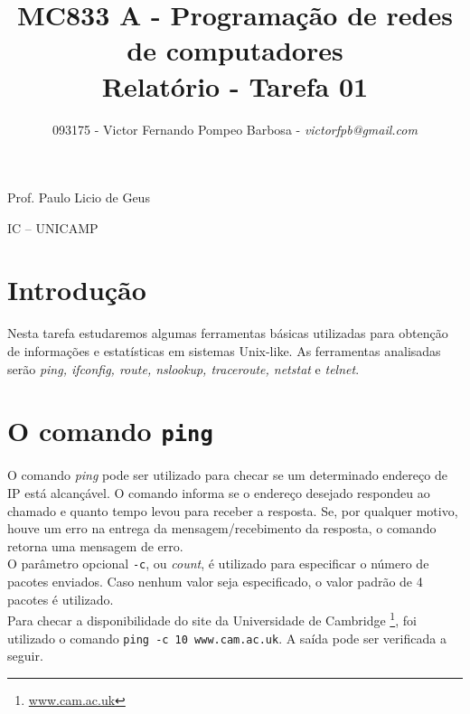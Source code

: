 \documentclass[a4paper,10pt]{article}
\begin{document}


\title{MC833 A - Programação de redes de computadores\\
Relatório - Tarefa 01}

\author {093175 - Victor Fernando Pompeo Barbosa - \textit{victorfpb@gmail.com}}


\maketitle

\centerline{Prof. Paulo Licio de Geus}
\centerline{IC -- UNICAMP}

\vspace{2cm}
\tableofcontents
    
\newpage
\section{Introdução}
\hspace{14pt}

    Nesta tarefa estudaremos algumas ferramentas básicas utilizadas para obtenção de informações e estatísticas em sistemas Unix-like. As ferramentas analisadas serão \textit{ping, ifconfig, route, nslookup, traceroute, netstat} e \textit{telnet}.

\section{O comando {\tt ping}}
O comando \textit{ping} pode ser utilizado para checar se um determinado endereço de IP está alcançável. O comando informa se o endereço desejado respondeu ao chamado e quanto tempo levou para receber a resposta. Se, por qualquer motivo, houve um erro na entrega da mensagem/recebimento da resposta, o comando retorna uma mensagem de erro.\\

O parâmetro opcional {\tt -c}, ou \textit{count}, é utilizado para especificar o número de pacotes enviados. Caso nenhum valor seja especificado, o valor padrão de 4 pacotes é utilizado.\\

Para checar a disponibilidade do site da Universidade de Cambridge \footnote{ \url{www.cam.ac.uk}}, foi utilizado o comando {\tt ping -c 10 www.cam.ac.uk}. A saída pode ser verificada a seguir.\\
\end{document}
